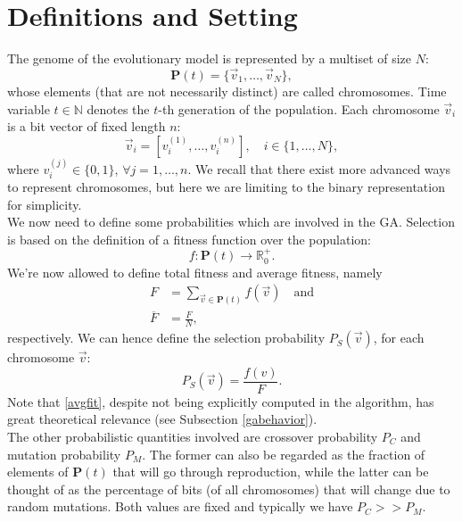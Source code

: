 \documentclass[%
    corpo=11pt,
    twoside,
    stile=classica,
    oldstyle,
    autoretitolo,
    tipotesi=magistrale,
    greek,
    evenboxes,
    english
]{toptesi}
\begin{document}
\section{Definitions and Setting}
The genome of the evolutionary model is represented by a multiset of size $N$:
\begin{equation}
\textbf{P}(t) = \{\vec{v}_1, \dots, \vec{v}_N \},
\end{equation}
whose elements (that are not necessarily distinct) are called chromosomes. Time variable $t\in \mathbb{N}$ denotes the $t$-th generation of the population. Each chromosome $\vec{v}_i$ is a bit vector of fixed length $n$:
\begin{equation}
\vec{v}_i = \left[v_i^{(1)}, \dots, v_i^{(n)} \right], \quad i \in \{1, \dots, N\},
\end{equation}
where $v_i^{(j)} \in \{0,1\}$, $\forall j = 1, \dots, n$. We recall that there exist more advanced ways to represent chromosomes, but here we are limiting to the binary representation for simplicity. \\
We now need to define some probabilities which are involved in the GA. Selection is based on the definition of a fitness function over the population:
\begin{equation}
f: \textbf{P}(t) \longrightarrow \mathbb{R}_0^{+}.
\end{equation}
We're now allowed to define total fitness and average fitness, namely
\begin{align}
F &= \sum_{\vec{v}\in \textbf{P}(t)}f(\vec{v}) \quad \text{and} \\
\overline{F} &= \frac{F}{N}, \label{avgfit}
\end{align}
respectively. We can hence define the selection probability $P_S(\vec{v})$, for each chromosome $\vec{v}$:
\begin{equation}
P_S(\vec{v}) = \frac{f(v)}{F}.
\end{equation}
Note that \eqref{avgfit}, despite not being explicitly computed in the algorithm, has great theoretical relevance (see Subsection \ref{gabehavior}). \\
The other probabilistic quantities involved are crossover probability $P_C$ and mutation probability $P_M$. The former can also be regarded as the fraction of elements of $\textbf{P}(t)$ that will go through reproduction, while the latter can be thought of as the percentage of bits (of all chromosomes) that will change due to random mutations. Both values are fixed and typically we have $P_C >> P_M$.
\end{document}
